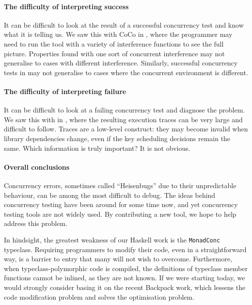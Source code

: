 \paragraph{The difficulty of interpreting success}
It can be difficult to look at the result of a successful concurrency
test and know what it is telling us.  We saw this with CoCo in
, where the programmer may need to run the tool
with a variety of interference functions to see the full picture.
Properties found with one sort of concurrent interference may not
generalise to cases with different interference.  Similarly,
successful concurrency tests in \dejafu{} may not generalise to cases
where the concurrent environment is different.

\paragraph{The difficulty of interpreting failure}
It can be difficult to look at a failing concurrency test and diagnose
the problem.  We saw this with \dejafu{} in
, where the resulting execution
traces can be very large and difficult to follow.  Traces are a
low-level construct: they may become invalid when library dependencies
change, even if the key scheduling decisions remain the same.  Which
information is truly important?  It is not obvious.

\paragraph{Overall conclusions}
Concurrency errors, sometimes called ``Heisenbugs'' due to their
unpredictable behaviour, can be among the most difficult to
debug\cite{musuvathi2008osdi}.  The ideas behind concurrency testing
have been around for some time now\cite{godefroid1996}, and yet
concurrency testing tools are not widely used.  By contributing a new
tool, we hope to help address this problem.

In hindsight, the greatest weakness of our Haskell work is the
\verb|MonadConc| typeclass.  Requiring programmers to modify their
code, even in a straightforward way, is a barrier to entry that many
will not wish to overcome.  Furthermore, when typeclass-polymorphic
code is compiled, the definitions of typeclass member functions cannot
be inlined, as they are not known\cite{peytonjones2002}.  If we were
starting \dejafu{} today, we would strongly consider basing it on the
recent Backpack work\cite{yang2017}, which lessens the code
modification problem and solves the optimisation problem.
